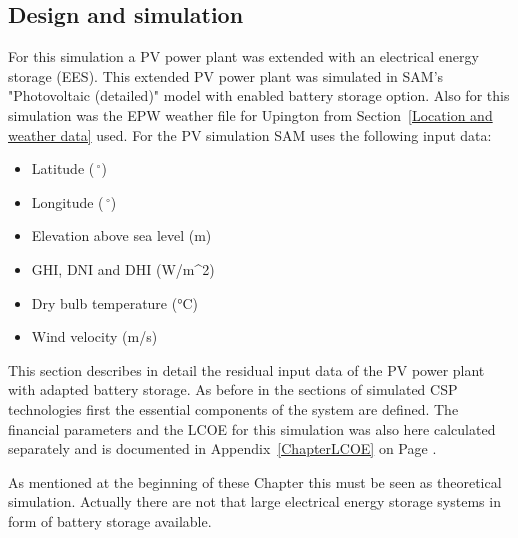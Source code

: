 \subsection{Design and simulation} \label{section PV system}
For this simulation a PV power plant was extended with an electrical energy storage (EES). This extended PV power plant was simulated in SAM's "Photovoltaic (detailed)" model with enabled battery storage option. Also for this simulation was the EPW weather file for Upington from Section~\ref{Location and weather data} used. For the PV simulation SAM uses the following input data:
\begin{itemize}
\item Latitude ($\,^{\circ}$)
\item Longitude ($\,^{\circ}$)
\item Elevation above sea level (m)
\item GHI, DNI and DHI (W/m^2)
\item Dry bulb temperature (\si{\celsius})
\item Wind velocity (m/s)
\end{itemize}
This section describes in detail the residual input data of the PV power plant with adapted battery storage. As before in the sections of simulated CSP technologies first the essential components of the system are defined. The financial parameters and the LCOE for this simulation was also here calculated separately and is documented in Appendix~\ref{ChapterLCOE} on Page \pageref{ChapterLCOE}.



As mentioned at the beginning of these Chapter this must be seen as theoretical simulation. Actually there are not that large electrical energy storage systems in form of battery storage available.



